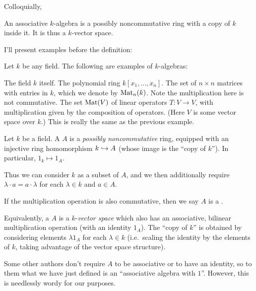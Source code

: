 Colloquially,
\begin{moral}
	An associative $k$-algebra is
	a possibly noncommutative ring with a copy of $k$ inside it.
	It is thus a $k$-vector space.
\end{moral}
I'll present examples before the definition:
\begin{example}
	Let $k$ be any field. The following are examples of $k$-algebras:
	\begin{enumerate}[(a)]
		\ii The field $k$ itself.
		\ii The polynomial ring $k[x_1, \dots, x_n]$.
		\ii The set of $n \times n$ matrices with entries in $k$,
		which we denote by $\mathrm{Mat}_n(k)$.
		Note the multiplication here is not commutative.
		\ii The set $\mathrm{Mat}(V)$ of linear operators $T : V \to V$,
		with multiplication given by the composition of operators.
		(Here $V$ is some vector space over $k$.)
		This is really the same as the previous example.
	\end{enumerate}
\end{example}
\begin{definition}
	Let $k$ be a field.
	A  $A$ is a \emph{possibly noncommutative} ring,
	equipped with an injective ring homomorphism $k \hookrightarrow A$
	(whose image is the ``copy of $k$'').
	In particular, $1_k \mapsto 1_A$.

	Thus we can consider $k$ as a subset of $A$, and
	we then additionally require $\lambda \cdot a = a \cdot \lambda$
	for each $\lambda \in k$ and $a \in A$.

	If the multiplication operation is also commutative,
	then we say $A$ is a .
\end{definition}
\begin{definition}
	Equivalently, a  $A$ is a
	$k$-\emph{vector space} which also has an associative,
	bilinear multiplication operation (with an identity $1_A$).
	The ``copy of $k$'' is obtained by considering elements
	$\lambda 1_A$ for each $\lambda \in k$
	(i.e.\ scaling the identity by the elements of $k$,
	taking advantage of the vector space structure).
\end{definition}

\begin{abuse}
	Some other authors don't require $A$ to be associative or to have
	an identity, so to them what we have just defined is an
	``associative algebra with $1$''.
	However, this is needlessly wordy for our purposes.
\end{abuse}

